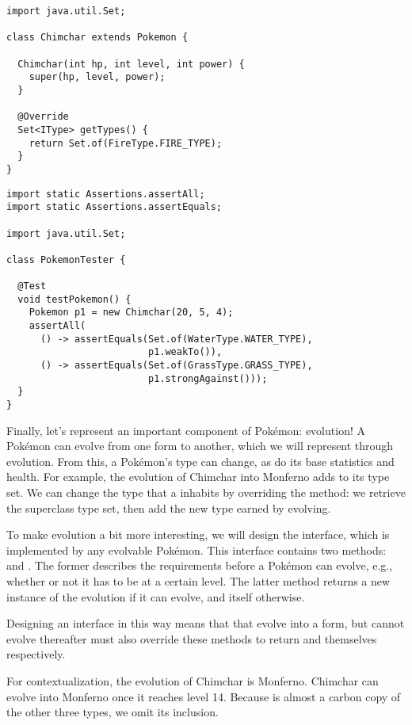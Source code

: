 \begin{lstlisting}[language=MyJava]
import java.util.Set;

class Chimchar extends Pokemon {

  Chimchar(int hp, int level, int power) {
    super(hp, level, power);
  }

  @Override
  Set<IType> getTypes() {
    return Set.of(FireType.FIRE_TYPE);
  }
}
\end{lstlisting}

\begin{lstlisting}[language=MyJava]
import static Assertions.assertAll;
import static Assertions.assertEquals;

import java.util.Set;

class PokemonTester {

  @Test
  void testPokemon() {
    Pokemon p1 = new Chimchar(20, 5, 4);
    assertAll(
      () -> assertEquals(Set.of(WaterType.WATER_TYPE),
                         p1.weakTo()),
      () -> assertEquals(Set.of(GrassType.GRASS_TYPE),
                         p1.strongAgainst()));
  }
}
\end{lstlisting}

Finally, let's represent an important component of Pok\'emon: evolution! A Pok\'emon can evolve from one form to another, which we will represent through evolution. From this, a Pok\'emon's type can change, as do its base statistics and health. For example, the evolution of Chimchar into Monferno adds  to its type set. We can change the type that a  inhabits by overriding the  method: we retrieve the superclass type set, then add the new type earned by evolving.

To make evolution a bit more interesting, we will design the  interface, which is implemented by any evolvable Pok\'emon. This interface contains two methods:  and . The former describes the requirements before a Pok\'emon can evolve, e.g., whether or not it has to be at a certain level. The latter  method returns a new instance of the evolution if it can evolve, and itself otherwise. 

Designing an interface in this way means that  that evolve into a form, but cannot evolve thereafter must also override these methods to return  and themselves respectively.

For contextualization, the evolution of Chimchar is Monferno. Chimchar can evolve into Monferno once it reaches level 14. Because  is almost a carbon copy of the other three types, we omit its inclusion.


